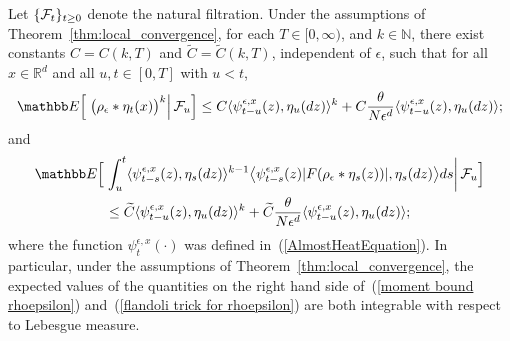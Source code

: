 \documentclass[EJP]{ejpecp} %
\newcommand{\IE}{\mathbb E}
\newcommand{\IR}{\mathbb R}
\newcommand{\IN}{\mathbb N}
\begin{document}
\begin{lemma}
\label{bounds on moments}
Let $\{{\cal F}_t\}_{t\geq 0}$ denote the natural filtration. 
Under the assumptions of Theorem~\ref{thm:local_convergence},
for each $T\in [0,\infty)$, and $k\in\IN$, there exist constants $C=C(k,T)$ and
$\widetilde{C}=\widetilde{C}(k,T)$, independent of $\epsilon$, such that for all 
$x\in\IR^d$ and all $u,t\in [0,T]$ with $u<t$,
\begin{equation}
\label{moment bound rhoepsilon}
\IE\Big[\left.\big(\rho_\epsilon*\eta_t(x)\big)^k\right| {\cal F}_u\Big]
\leq C\langle\psi_{t-u}^{\epsilon,x}(z), \eta_u(dz)\rangle^k
+C\frac{\theta}{N\epsilon^d}
\langle\psi_{t-u}^{\epsilon,x}(z), \eta_u(dz)\rangle;
\end{equation} 
and
\begin{multline}
\label{flandoli trick for rhoepsilon}
\IE\Big[\left. \int_u^t\langle\psi_{t-s}^{\epsilon,x}(z),\eta_s(dz)\rangle^{k-1}
\big\langle\psi_{t-s}^{\epsilon,x}(z)|F(\rho_\epsilon*\eta_s(z))|,
\eta_s(dz)\big\rangle ds\right| {\cal F}_u\Big]
\\
\leq\widetilde{C}\langle\psi_{t-u}^{\epsilon,x}(z), \eta_u(dz)\rangle^k
+\widetilde{C}\frac{\theta}{N\epsilon^d}
\langle\psi_{t-u}^{\epsilon,x}(z), \eta_u(dz)\rangle;
\end{multline}
where the function $\psi^{\epsilon,x}_t(\cdot)$ was
defined in~(\ref{AlmostHeatEquation}).
In particular, 
under the assumptions of Theorem~\ref{thm:local_convergence}, the
expected values of the
quantities on the right hand side of~(\ref{moment bound rhoepsilon})
and~(\ref{flandoli trick for rhoepsilon}) are both integrable 
with respect to Lebesgue measure.  
\end{lemma}
\end{document}
